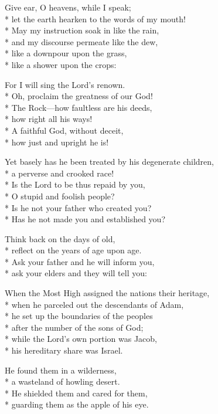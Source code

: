Give ear, O heavens, while I speak; \\*
let the earth hearken to the words of my mouth!\\*
May my instruction soak in like the rain, \\*
and my discourse permeate like the dew,\\*
like a downpour upon the grass, \\*
like a shower upon the crops:

For I will sing the Lord's renown. \\*
Oh, proclaim the greatness of our God!\\*
The Rock—how faultless are his deeds, \\*
how right all his ways!\\*
A faithful God, without deceit, \\*
how just and upright he is!

Yet basely has he been treated by his degenerate children, \\*
a perverse and crooked race!\\*
Is the Lord to be thus repaid by you, \\*
O stupid and foolish people?\\*
Is he not your father who created you? \\*
Has he not made you and established you?

Think back on the days of old, \\*
reflect on the years of age upon age.\\*
Ask your father and he will inform you, \\*
ask your elders and they will tell you:

When the Most High assigned the nations their heritage, \\*
when he parceled out the descendants of Adam,\\*
he set up the boundaries of the peoples \\*
after the number of the sons of God;\\*
while the Lord's own portion was Jacob, \\*
his hereditary share was Israel.

He found them in a wilderness, \\*
a wasteland of howling desert.\\*
He shielded them and cared for them, \\*
guarding them as the apple of his eye.

